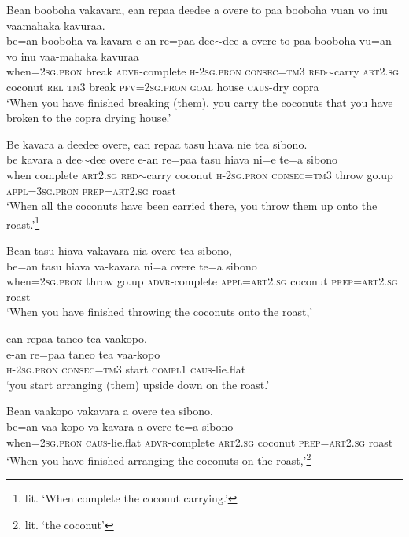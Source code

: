 \ea\label{ex:text01-156}
Bean booboha vakavara, ean repaa deedee a overe to paa booboha vuan vo inu vaamahaka kavuraa.\\
\gll be=an	booboha	va-kavara	e-an	re=paa	dee{$\sim$}dee	a	overe	to	paa	booboha	vu=an	vo	inu	vaa-mahaka	kavuraa\\
     when=2\textsc{sg}.\textsc{pron}	break	\textsc{advr}-complete	\textsc{h}-2\textsc{sg}.\textsc{pron}	\textsc{consec}=\textsc{tm}3	\textsc{red}{$\sim$}carry	\textsc{art}2.\textsc{sg}	coconut	\textsc{rel}	\textsc{tm}3	break	\textsc{pfv}=2\textsc{sg}.\textsc{pron}	\textsc{goal}	house	\textsc{caus}-dry	copra\\
\glt `When you have finished breaking (them), you carry the coconuts that you have broken to the copra drying house.'
\z

\ea\label{ex:text01-157}
Be kavara a deedee overe, ean repaa tasu hiava nie tea sibono.\\
\gll be	kavara	a	dee{$\sim$}dee	overe	e-an	re=paa	tasu	hiava	ni=e	te=a	sibono\\
     when	complete	\textsc{art}2.\textsc{sg}	\textsc{red}{$\sim$}carry	coconut	\textsc{h}-2\textsc{sg}.\textsc{pron}	\textsc{consec}=\textsc{tm}3	throw	go.up	\textsc{appl}=3\textsc{sg}.\textsc{pron}	\textsc{prep}=\textsc{art}2.\textsc{sg}	roast\\
\glt `When all the coconuts have been carried there, you throw them up onto the roast.'\footnote{lit. `When complete the coconut carrying.'}
\z

\ea\label{ex:text01-158}
Bean tasu hiava vakavara nia overe tea sibono,\\
\gll be=an	tasu	hiava	va-kavara	ni=a	overe	te=a	sibono\\
     when=2\textsc{sg}.\textsc{pron}	throw	go.up	\textsc{advr}-complete	\textsc{appl}=\textsc{art}2.\textsc{sg}	coconut	\textsc{prep}=\textsc{art}2.\textsc{sg}	roast\\
\glt `When you have finished throwing the coconuts onto the roast,'
\z

\ea\label{ex:text01-159}
ean repaa taneo tea vaakopo.\\
\gll e-an	re=paa	taneo	tea	vaa-kopo\\
     \textsc{h}-2\textsc{sg}.\textsc{pron}	\textsc{consec}=\textsc{tm}3	start	\textsc{compl}1	\textsc{caus}-lie.flat\\
\glt `you start arranging (them) upside down on the roast.'
\z

\ea\label{ex:text01-160}
Bean vaakopo vakavara a overe tea sibono,\\
\gll be=an	vaa-kopo	va-kavara	a	overe	te=a	sibono\\
     when=2\textsc{sg}.\textsc{pron}	\textsc{caus}-lie.flat	\textsc{advr}-complete	\textsc{art}2.\textsc{sg}	coconut	\textsc{prep}=\textsc{art}2.\textsc{sg}	roast\\
\glt `When you have finished arranging the coconuts on the roast,'\footnote{lit. `the coconut'}
\z

